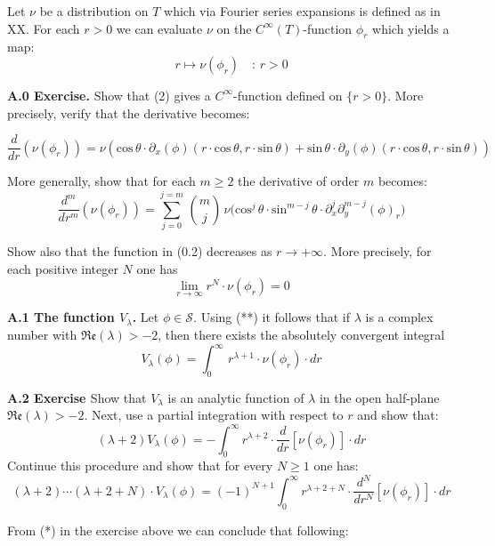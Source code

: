 \noindent
Let $\nu$ be a distribution on $T$ which via Fourier series expansions is
defined as in XX.
For each $r>0$ we
can evaluate $\nu$ on the
$C^\infty(T)$-function $\phi_r$ which yields a map:
\[ 
r\mapsto \nu(\phi_r)\quad\colon\, r>0\tag{0.2}
\]

\medskip

\noindent
{\bf{A.0 Exercise.}}
Show that (2) gives a $C^\infty$-function defined on
$\{r>0\}$. More precisely, verify that the derivative becomes:


\[
\frac{d}{dr}(\nu(\phi_r))=
\nu(\text{cos}\,\theta\cdot\partial_x(\phi)(r\cdot\text{cos}\,\theta,r\cdot\text{sin}\,\theta)+
\text{sin}\,\theta\cdot\partial_y(\phi)(r\cdot\text{cos}\,\theta,r\cdot\text{sin}\,\theta))
\]

\noindent
More generally, show that for each $m\geq 2$ the derivative of order $m$ becomes:
\[
\frac{d^m}{dr^m}(\nu(\phi_r))=\sum_{j=0}^{j=m}\,
\binom{m}{j}\,
\nu\bigl(\text{cos}^j\,\theta\cdot \text{sin}^{m-j}\,\theta\cdot
\partial^j_x\partial_y^{m-j}(\phi)_r\bigr)\tag{*}
\]
\medskip


\noindent
Show also that the function in (0.2) decreases as $r\to+\infty$. More precisely, for
each positive integer $N$ one has
\[
\lim_{r\to\infty} r^N\cdot\nu(\phi_r)=0\tag{**}
 \]
 
\medskip



\noindent
{\bf{A.1 The function $V_\lambda$.}}
Let $\phi\in\mathcal S$.
Using (**) it follows that
if $\lambda$ is a complex number with
$\mathfrak{Re}(\lambda)>-2$, then  there exists  the absolutely convergent integral
\[ 
V_\lambda(\phi)=
\int_0^\infty\,
r^{\lambda+1}\cdot \nu(\phi_r)\cdot dr\tag{1}
\]


\medskip

\noindent
{\bf{A.2 Exercise }}
Show that $V_\lambda$
is an analytic function of
$\lambda$ in the open half-plane
$\mathfrak{Re}(\lambda)>-2$.
Next, use a partial integration with respect to $r$ and show that:
\[
(\lambda+2)V_\lambda(\phi)=-\int_0^\infty
r^{\lambda+2}\cdot \frac{d}{dr}[\nu(\phi_r)]\cdot dr
\]
Continue this procedure and show that for every
$N\geq 1$ one has:
\[
(\lambda+2)\cdots(\lambda+2+N)\cdot V_\lambda(\phi)=
(-1)^{N+1}\int_0^\infty
r^{\lambda+2+N}\cdot \frac{d^N}{dr^N}[\nu(\phi_r)]\cdot dr\tag{*}
\]




\noindent
From (*) in the exercise above
we can conclude that following:


\medskip

